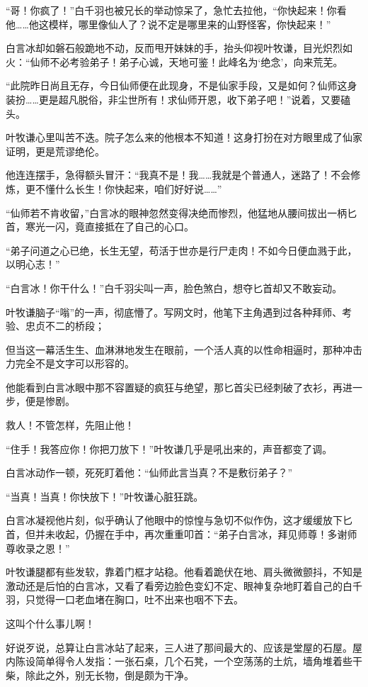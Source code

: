“哥！你疯了！”白千羽也被兄长的举动惊呆了，急忙去拉他，“你快起来！你看他……他这模样，哪里像仙人了？说不定是哪里来的山野怪客，你快起来！”

白言冰却如磐石般跪地不动，反而甩开妹妹的手，抬头仰视叶牧谦，目光炽烈如火：“仙师不必考验弟子！弟子心诚，天地可鉴！此峰名为‘绝念’，向来荒芜。

“此院昨日尚且无存，今日仙师便在此现身，不是仙家手段，又是如何？仙师这身装扮……更是超凡脱俗，非尘世所有！求仙师开恩，收下弟子吧！”说着，又要磕头。

叶牧谦心里叫苦不迭。院子怎么来的他根本不知道！这身打扮在对方眼里成了仙家证明，更是荒谬绝伦。

他连连摆手，急得额头冒汗：“我真不是！我……我就是个普通人，迷路了！不会修炼，更不懂什么长生！你快起来，咱们好好说……”

“仙师若不肯收留，”白言冰的眼神忽然变得决绝而惨烈，他猛地从腰间拔出一柄匕首，寒光一闪，竟直接抵在了自己的心口。

“弟子问道之心已绝，长生无望，苟活于世亦是行尸走肉！不如今日便血溅于此，以明心志！”

“白言冰！你干什么！”白千羽尖叫一声，脸色煞白，想夺匕首却又不敢妄动。

叶牧谦脑子“嗡”的一声，彻底懵了。写网文时，他笔下主角遇到过各种拜师、考验、忠贞不二的桥段；

但当这一幕活生生、血淋淋地发生在眼前，一个活人真的以性命相逼时，那种冲击力完全不是文字可以形容的。

他能看到白言冰眼中那不容置疑的疯狂与绝望，那匕首尖已经刺破了衣衫，再进一步，便是惨剧。

救人！不管怎样，先阻止他！

“住手！我答应你！你把刀放下！”叶牧谦几乎是吼出来的，声音都变了调。

白言冰动作一顿，死死盯着他：“仙师此言当真？不是敷衍弟子？”

“当真！当真！你快放下！”叶牧谦心脏狂跳。

白言冰凝视他片刻，似乎确认了他眼中的惊惶与急切不似作伪，这才缓缓放下匕首，但并未收起，仍握在手中，再次重重叩首：“弟子白言冰，拜见师尊！多谢师尊收录之恩！”

叶牧谦腿都有些发软，靠着门框才站稳。他看着跪伏在地、肩头微微颤抖，不知是激动还是后怕的白言冰，又看了看旁边脸色变幻不定、眼神复杂地盯着自己的白千羽，只觉得一口老血堵在胸口，吐不出来也咽不下去。

这叫个什么事儿啊！

好说歹说，总算让白言冰站了起来，三人进了那间最大的、应该是堂屋的石屋。屋内陈设简单得令人发指：一张石桌，几个石凳，一个空荡荡的土炕，墙角堆着些干柴，除此之外，别无长物，倒是颇为干净。

